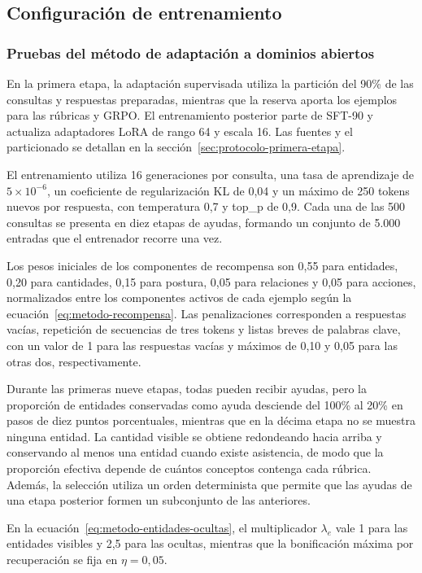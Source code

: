 \subsection{Configuración de entrenamiento}
\label{sec:metodo-configuracion}
\label{sec:protocolo-configuracion}
\subsubsection{Pruebas del método de adaptación a dominios abiertos}
En la primera etapa, la adaptación supervisada utiliza la partición del 90\% de las consultas y respuestas preparadas, mientras que la reserva aporta los ejemplos para las rúbricas y GRPO. El entrenamiento posterior parte de SFT-90 y actualiza adaptadores LoRA de rango 64 y escala 16. Las fuentes y el particionado se detallan en la sección~\ref{sec:protocolo-primera-etapa}.

El entrenamiento utiliza 16 generaciones por consulta, una tasa de aprendizaje de $5\times10^{-6}$, un coeficiente de regularización KL de 0,04 y un máximo de 250 tokens nuevos por respuesta, con temperatura 0,7 y top\_p de 0,9. Cada una de las 500 consultas se presenta en diez etapas de ayudas, formando un conjunto de 5.000 entradas que el entrenador recorre una vez.

Los pesos iniciales de los componentes de recompensa son 0,55 para entidades, 0,20 para cantidades, 0,15 para postura, 0,05 para relaciones y 0,05 para acciones, normalizados entre los componentes activos de cada ejemplo según la ecuación~\ref{eq:metodo-recompensa}. Las penalizaciones corresponden a respuestas vacías, repetición de secuencias de tres tokens y listas breves de palabras clave, con un valor de 1 para las respuestas vacías y máximos de 0,10 y 0,05 para las otras dos, respectivamente.

Durante las primeras nueve etapas, todas pueden recibir ayudas, pero la proporción de entidades conservadas como ayuda desciende del 100\% al 20\% en pasos de diez puntos porcentuales, mientras que en la décima etapa no se muestra ninguna entidad. La cantidad visible se obtiene redondeando hacia arriba y conservando al menos una entidad cuando existe asistencia, de modo que la proporción efectiva depende de cuántos conceptos contenga cada rúbrica. Además, la selección utiliza un orden determinista que permite que las ayudas de una etapa posterior formen un subconjunto de las anteriores.

En la ecuación~\ref{eq:metodo-entidades-ocultas}, el multiplicador $\lambda_e$ vale 1 para las entidades visibles y 2,5 para las ocultas, mientras que la bonificación máxima por recuperación se fija en $\eta=0{,}05$.

